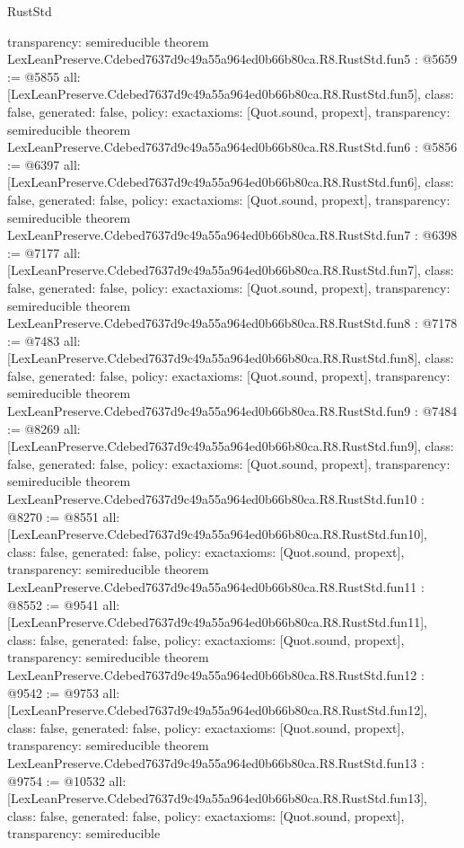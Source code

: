\begin{lexlean}{RustStd}
\begin{coremodule}
{  transparency: semireducible
}
theorem LexLeanPreserve.Cdebed7637d9c49a55a964ed0b66b80ca.R8.RustStd.fun5 : @5659 := @5855 {
  all: [LexLeanPreserve.Cdebed7637d9c49a55a964ed0b66b80ca.R8.RustStd.fun5],
  class: false,
  generated: false,
  policy: exact{axioms: [Quot.sound, propext]},
  transparency: semireducible
}
theorem LexLeanPreserve.Cdebed7637d9c49a55a964ed0b66b80ca.R8.RustStd.fun6 : @5856 := @6397 {
  all: [LexLeanPreserve.Cdebed7637d9c49a55a964ed0b66b80ca.R8.RustStd.fun6],
  class: false,
  generated: false,
  policy: exact{axioms: [Quot.sound, propext]},
  transparency: semireducible
}
theorem LexLeanPreserve.Cdebed7637d9c49a55a964ed0b66b80ca.R8.RustStd.fun7 : @6398 := @7177 {
  all: [LexLeanPreserve.Cdebed7637d9c49a55a964ed0b66b80ca.R8.RustStd.fun7],
  class: false,
  generated: false,
  policy: exact{axioms: [Quot.sound, propext]},
  transparency: semireducible
}
theorem LexLeanPreserve.Cdebed7637d9c49a55a964ed0b66b80ca.R8.RustStd.fun8 : @7178 := @7483 {
  all: [LexLeanPreserve.Cdebed7637d9c49a55a964ed0b66b80ca.R8.RustStd.fun8],
  class: false,
  generated: false,
  policy: exact{axioms: [Quot.sound, propext]},
  transparency: semireducible
}
theorem LexLeanPreserve.Cdebed7637d9c49a55a964ed0b66b80ca.R8.RustStd.fun9 : @7484 := @8269 {
  all: [LexLeanPreserve.Cdebed7637d9c49a55a964ed0b66b80ca.R8.RustStd.fun9],
  class: false,
  generated: false,
  policy: exact{axioms: [Quot.sound, propext]},
  transparency: semireducible
}
theorem LexLeanPreserve.Cdebed7637d9c49a55a964ed0b66b80ca.R8.RustStd.fun10 : @8270 := @8551 {
  all: [LexLeanPreserve.Cdebed7637d9c49a55a964ed0b66b80ca.R8.RustStd.fun10],
  class: false,
  generated: false,
  policy: exact{axioms: [Quot.sound, propext]},
  transparency: semireducible
}
theorem LexLeanPreserve.Cdebed7637d9c49a55a964ed0b66b80ca.R8.RustStd.fun11 : @8552 := @9541 {
  all: [LexLeanPreserve.Cdebed7637d9c49a55a964ed0b66b80ca.R8.RustStd.fun11],
  class: false,
  generated: false,
  policy: exact{axioms: [Quot.sound, propext]},
  transparency: semireducible
}
theorem LexLeanPreserve.Cdebed7637d9c49a55a964ed0b66b80ca.R8.RustStd.fun12 : @9542 := @9753 {
  all: [LexLeanPreserve.Cdebed7637d9c49a55a964ed0b66b80ca.R8.RustStd.fun12],
  class: false,
  generated: false,
  policy: exact{axioms: [Quot.sound, propext]},
  transparency: semireducible
}
theorem LexLeanPreserve.Cdebed7637d9c49a55a964ed0b66b80ca.R8.RustStd.fun13 : @9754 := @10532 {
  all: [LexLeanPreserve.Cdebed7637d9c49a55a964ed0b66b80ca.R8.RustStd.fun13],
  class: false,
  generated: false,
  policy: exact{axioms: [Quot.sound, propext]},
  transparency: semireducible
}
\end{coremodule}
\end{lexlean}
